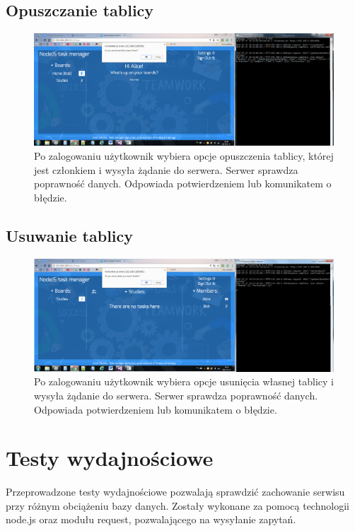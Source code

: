 \documentclass[12pt]{report}
\begin{document}
\subsection{Opuszczanie tablicy}
\begin{figure}[!hb]
\centering
\includegraphics[width=\textwidth,height=\textheight,keepaspectratio]{D2.png}
\captionsetup{labelformat=empty}
\caption[]{Po zalogowaniu użytkownik wybiera opcje opuszczenia tablicy, której jest członkiem i wysyła żądanie do serwera. 
Serwer sprawdza poprawność danych. Odpowiada potwierdzeniem lub komunikatem o błędzie.}
\end{figure}

\subsection{Usuwanie tablicy}
\begin{figure}[!hb]
\centering
\includegraphics[width=\textwidth,height=\textheight,keepaspectratio]{E2.png}
\captionsetup{labelformat=empty}
\caption[]{Po zalogowaniu użytkownik wybiera opcje usunięcia własnej tablicy i wysyła żądanie do serwera. Serwer sprawdza poprawność danych. Odpowiada potwierdzeniem lub komunikatem o błędzie.}
\end{figure}


\section{Testy wydajnościowe}
Przeprowadzone testy wydajnościowe pozwalają sprawdzić zachowanie serwisu przy różnym obciążeniu bazy danych. Zostały wykonane za pomocą technologii node.js oraz modułu request, pozwalającego na wysyłanie zapytań.
\end{document}
